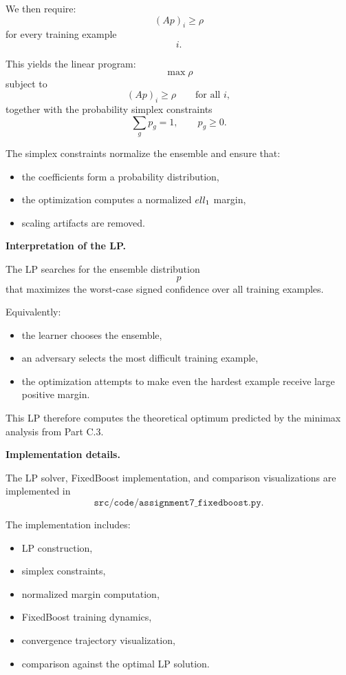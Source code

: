 \documentclass[11pt]{article}
\begin{document}
\begin{enumerate}
\begin{solutionbox}
We then require:
\[
(Ap)_i\ge\rho
\]
for every training example
\[
i.
\]

This yields the linear program:
\[
\boxed{
\max \rho
}
\]
subject to
\[
(Ap)_i\ge\rho
\qquad
\text{for all }i,
\]
together with the probability simplex constraints
\[
\sum_gp_g=1,
\qquad
p_g\ge0.
\]

The simplex constraints normalize the ensemble and ensure that:
\begin{itemize}
    \item the coefficients form a probability distribution,
    \item the optimization computes a normalized $\\ell_1$ margin,
    \item scaling artifacts are removed.
\end{itemize}

\medskip

\textbf{Interpretation of the LP.}

The LP searches for the ensemble distribution
\[
p
\]
that maximizes the worst-case signed confidence over all training examples.

Equivalently:
\begin{itemize}
    \item the learner chooses the ensemble,
    \item an adversary selects the most difficult training example,
    \item the optimization attempts to make even the hardest example receive large positive margin.
\end{itemize}

This LP therefore computes the theoretical optimum predicted by the minimax analysis from Part C.3.

\medskip

\textbf{Implementation details.}

The LP solver, FixedBoost implementation, and comparison visualizations are implemented in
\[
\texttt{src/code/assignment7\_fixedboost.py}.
\]

The implementation includes:
\begin{itemize}
    \item LP construction,
    \item simplex constraints,
    \item normalized margin computation,
    \item FixedBoost training dynamics,
    \item convergence trajectory visualization,
    \item comparison against the optimal LP solution.
\end{itemize}


\end{solutionbox}
\end{enumerate}
\end{document}
